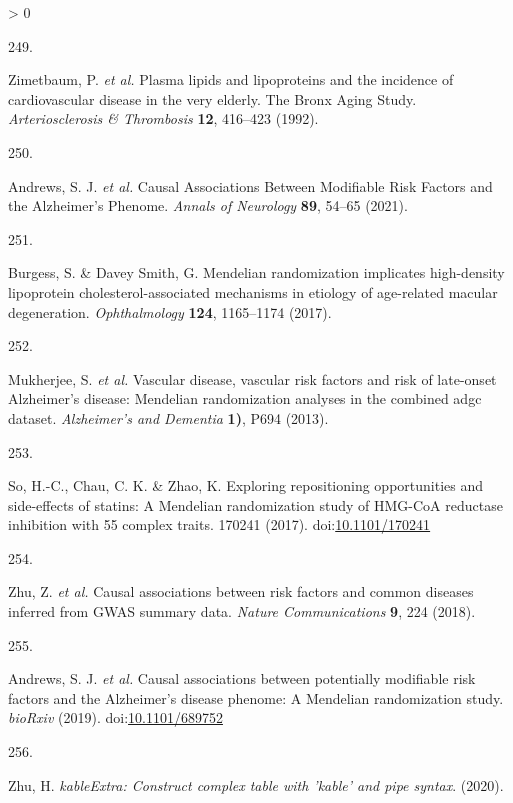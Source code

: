 \documentclass[a4paper, twoside]{templates/ociamthesis}
\newlength{\cslhangindent}
\newlength{\csllabelwidth}
\newenvironment{CSLReferences}[3] %
 {%
  \setlength{\parindent}{0pt}
  \ifodd #1 \everypar{\setlength{\hangindent}{\cslhangindent}}\ignorespaces\fi
  \ifnum #2 > 0
  \setlength{\parskip}{#2\baselineskip}
  \fi
 }%
 {}
\newcommand{\CSLLeftMargin}[1]{\parbox[t]{\maxof{\widthof{#1}}{\csllabelwidth}}{#1}}
\newcommand{\CSLRightInline}[1]{\parbox[t]{\linewidth - \csllabelwidth}{#1}}
\begin{document}
\begin{CSLReferences}{0}{0}
\leavevmode\hypertarget{ref-zimetbaum1992}{}%
\CSLLeftMargin{249. }
\CSLRightInline{Zimetbaum, P. \emph{et al.} Plasma lipids and lipoproteins and the incidence of cardiovascular disease in the very elderly. {The Bronx Aging Study}. \emph{Arteriosclerosis \& Thrombosis} \textbf{12}, 416--423 (1992).}

\leavevmode\hypertarget{ref-andrews2021}{}%
\CSLLeftMargin{250. }
\CSLRightInline{Andrews, S. J. \emph{et al.} Causal {Associations Between Modifiable Risk Factors} and the {Alzheimer}'s {Phenome}. \emph{Annals of Neurology} \textbf{89}, 54--65 (2021).}

\leavevmode\hypertarget{ref-burgess2017}{}%
\CSLLeftMargin{251. }
\CSLRightInline{Burgess, S. \& Davey Smith, G. Mendelian randomization implicates high-density lipoprotein cholesterol-associated mechanisms in etiology of age-related macular degeneration. \emph{Ophthalmology} \textbf{124}, 1165--1174 (2017).}

\leavevmode\hypertarget{ref-mukherjee2013}{}%
\CSLLeftMargin{252. }
\CSLRightInline{Mukherjee, S. \emph{et al.} Vascular disease, vascular risk factors and risk of late-onset {Alzheimer}'s disease: Mendelian randomization analyses in the combined adgc dataset. \emph{Alzheimer's and Dementia} \textbf{1)}, P694 (2013).}

\leavevmode\hypertarget{ref-so2017}{}%
\CSLLeftMargin{253. }
\CSLRightInline{So, H.-C., Chau, C. K. \& Zhao, K. Exploring repositioning opportunities and side-effects of statins: A {Mendelian} randomization study of {HMG}-{CoA} reductase inhibition with 55 complex traits. 170241 (2017). doi:\href{https://doi.org/10.1101/170241}{10.1101/170241}}

\leavevmode\hypertarget{ref-zhu2018}{}%
\CSLLeftMargin{254. }
\CSLRightInline{Zhu, Z. \emph{et al.} Causal associations between risk factors and common diseases inferred from {GWAS} summary data. \emph{Nature Communications} \textbf{9}, 224 (2018).}

\leavevmode\hypertarget{ref-andrews2019}{}%
\CSLLeftMargin{255. }
\CSLRightInline{Andrews, S. J. \emph{et al.} Causal associations between potentially modifiable risk factors and the {Alzheimer}'s disease phenome: A {Mendelian} randomization study. \emph{bioRxiv} (2019). doi:\href{https://doi.org/10.1101/689752}{10.1101/689752}}

\leavevmode\hypertarget{ref-zhu2020}{}%
\CSLLeftMargin{256. }
\CSLRightInline{Zhu, H. \emph{{kableExtra}: Construct complex table with 'kable' and pipe syntax}. (2020).}


\end{CSLReferences}
\end{document}
